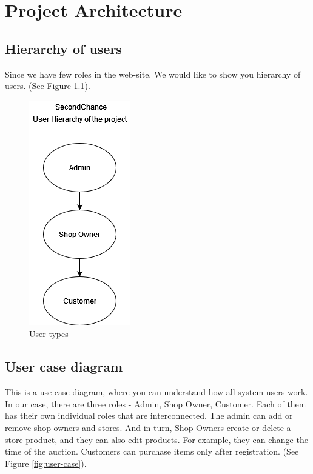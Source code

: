 \chapter{Project Architecture}\label{ch:B}

\section{Hierarchy of users}
Since we have few roles in the web-site. We would like to show you hierarchy of users. (See Figure \ref{fig:Hierarchy}).

\begin{figure}[h!]
    \centering
    \includegraphics[scale=0.6]{figures/Hierarchy.png}
    \caption{User types}
    \label{fig:Hierarchy}
\end{figure}

\section{User case diagram}
This is a use case diagram, where you can understand how all system users work.
In our case, there are three roles - Admin, Shop Owner, Customer.  Each of them has their own individual roles that are interconnected.  The admin can add or remove shop owners and stores.  And in turn, Shop Owners create or delete a store product, and they can also edit products.  For example, they can change the time of the auction.
Customers can purchase items only after registration. (See Figure \ref{fig:user-case}).

